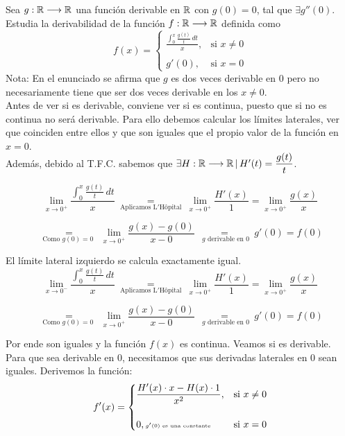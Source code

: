 \documentclass[12pt]{article}
\begin{document}
	\begin{ejercicio}[2 puntos]
		Sea $g:\mathbb{R}\longrightarrow\mathbb{R}$ una función derivable en $\mathbb{R}$ con $g(0)=0$, tal que $\exists g''(0)$. Estudia la derivabilidad de la función $f:\mathbb{R}\longrightarrow\mathbb{R}$ definida como \\
		$$ f(x) = 
		\begin{cases}
			\displaystyle \frac{\int_{0}^{x} \frac{g(t)}{t}\,dt}{x}, & \text{si } x \neq 0 \\
			\\
			g'(0), & \text{si } x = 0
		\end{cases}$$
		Nota: En el enunciado se afirma que $g$ es dos veces derivable en 0 pero no necesariamente tiene que ser dos veces derivable en los $x \neq 0$. \\
		
		Antes de ver si es derivable, conviene ver si es continua, puesto que si no es continua no será derivable. Para ello debemos calcular los límites laterales, ver que coinciden entre ellos y que son iguales que el propio valor de la función en $x=0$. \\
		
		Además, debido al T.F.C. sabemos que $\exists H:\mathbb{R}\longrightarrow\mathbb{R} \, | \, H'(t)= \displaystyle \frac{g(t)}{t}$.
		
		$$ \lim_{x\rightarrow0^+} \frac{\int_{0}^{x} \frac{g(t)}{t}\,dt}{x} \underset{\text{ Aplicamos L$'$Hôpital }}{=} \lim_{x\rightarrow0^+} \frac{H'(x)}{1} = \lim_{x\rightarrow0^+} \frac{g(x)}{x}$$
		
		$$\underset{\text{ Como $g(0)=0$ }}{=} \lim_{x\rightarrow0^+} \frac{g(x)-g(0)}{x-0} \underset{\text{ $g$ derivable en 0 }}{=} g'(0) = f(0)$$
		
		El límite lateral izquierdo se calcula exactamente igual.
		$$ \lim_{x\rightarrow0^-} \frac{\int_{0}^{x} \frac{g(t)}{t}\,dt}{x} \underset{\text{ Aplicamos L$'$Hôpital }}{=} \lim_{x\rightarrow0^+} \frac{H'(x)}{1} = \lim_{x\rightarrow0^+} \frac{g(x)}{x}$$

		$$\underset{\text{ Como $g(0)=0$ }}{=} \lim_{x\rightarrow0^+} \frac{g(x)-g(0)}{x-0} \underset{\text{ $g$ derivable en 0 }}{=} g'(0) = f(0)$$
		
		Por ende son iguales y la función $f(x)$ es continua. Veamos si es derivable. \\
		
		Para que sea derivable en $0$, necesitamos que sus derivadas laterales en $0$ sean iguales. Derivemos la función:
		$$ f'(x) = 
		\begin{cases}
			\displaystyle \frac{H'(x)\cdot x - H(x)\cdot 1}{x^2}, & \text{si } x \neq 0 \\
			\\
			0, \text{{\tiny $g'(0)$ es una constante}} & \text{si } x = 0
		\end{cases}$$
		

\end{ejercicio}
\end{document}
